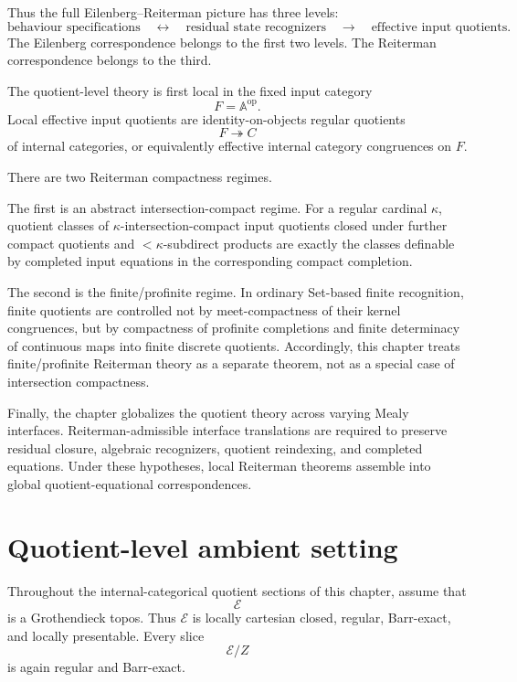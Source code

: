 Thus the full Eilenberg--Reiterman picture has three levels:
\[
\text{behaviour specifications}
\quad\longleftrightarrow\quad
\text{residual state recognizers}
\quad\longrightarrow\quad
\text{effective input quotients}.
\]
The Eilenberg correspondence belongs to the first two levels. The Reiterman
correspondence belongs to the third.

The quotient-level theory is first local in the fixed input category
\[
F=\mathbb A^{\mathrm{op}}.
\]
Local effective input quotients are identity-on-objects regular quotients
\[
F\twoheadrightarrow C
\]
of internal categories, or equivalently effective internal category
congruences on \(F\).

There are two Reiterman compactness regimes.

The first is an abstract intersection-compact regime. For a regular cardinal
\(\kappa\), quotient classes of \(\kappa\)-intersection-compact input
quotients closed under further compact quotients and \(<\kappa\)-subdirect
products are exactly the classes definable by completed input equations in
the corresponding compact completion.

The second is the finite/profinite regime. In ordinary Set-based finite
recognition, finite quotients are controlled not by meet-compactness of their
kernel congruences, but by compactness of profinite completions and finite
determinacy of continuous maps into finite discrete quotients. Accordingly,
this chapter treats finite/profinite Reiterman theory as a separate theorem,
not as a special case of intersection compactness.

Finally, the chapter globalizes the quotient theory across varying Mealy
interfaces. Reiterman-admissible interface translations are required to
preserve residual closure, algebraic recognizers, quotient reindexing, and
completed equations. Under these hypotheses, local Reiterman theorems assemble
into global quotient-equational correspondences.

\section{Quotient-level ambient setting}
\label{sec:reiterman-ambient-setting}

Throughout the internal-categorical quotient sections of this chapter, assume
that
\[
\mathcal E
\]
is a Grothendieck topos. Thus \(\mathcal E\) is locally cartesian closed,
regular, Barr-exact, and locally presentable. Every slice
\[
\mathcal E/Z
\]
is again regular and Barr-exact.

